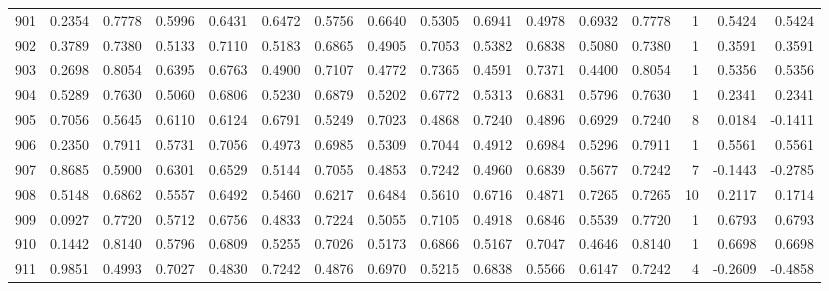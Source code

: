 \begin{tabular}{lrrrrrrrrrrrrrrr}
901 &      0.2354 &  0.7778 &  0.5996 &  0.6431 &  0.6472 &  0.5756 &  0.6640 &  0.5305 &  0.6941 &  0.4978 &   0.6932 &     0.7778 &      1 &                    0.5424 &                     0.5424 \\
902 &      0.3789 &  0.7380 &  0.5133 &  0.7110 &  0.5183 &  0.6865 &  0.4905 &  0.7053 &  0.5382 &  0.6838 &   0.5080 &     0.7380 &      1 &                    0.3591 &                     0.3591 \\
903 &      0.2698 &  0.8054 &  0.6395 &  0.6763 &  0.4900 &  0.7107 &  0.4772 &  0.7365 &  0.4591 &  0.7371 &   0.4400 &     0.8054 &      1 &                    0.5356 &                     0.5356 \\
904 &      0.5289 &  0.7630 &  0.5060 &  0.6806 &  0.5230 &  0.6879 &  0.5202 &  0.6772 &  0.5313 &  0.6831 &   0.5796 &     0.7630 &      1 &                    0.2341 &                     0.2341 \\
905 &      0.7056 &  0.5645 &  0.6110 &  0.6124 &  0.6791 &  0.5249 &  0.7023 &  0.4868 &  0.7240 &  0.4896 &   0.6929 &     0.7240 &      8 &                    0.0184 &                    -0.1411 \\
906 &      0.2350 &  0.7911 &  0.5731 &  0.7056 &  0.4973 &  0.6985 &  0.5309 &  0.7044 &  0.4912 &  0.6984 &   0.5296 &     0.7911 &      1 &                    0.5561 &                     0.5561 \\
907 &      0.8685 &  0.5900 &  0.6301 &  0.6529 &  0.5144 &  0.7055 &  0.4853 &  0.7242 &  0.4960 &  0.6839 &   0.5677 &     0.7242 &      7 &                   -0.1443 &                    -0.2785 \\
908 &      0.5148 &  0.6862 &  0.5557 &  0.6492 &  0.5460 &  0.6217 &  0.6484 &  0.5610 &  0.6716 &  0.4871 &   0.7265 &     0.7265 &     10 &                    0.2117 &                     0.1714 \\
909 &      0.0927 &  0.7720 &  0.5712 &  0.6756 &  0.4833 &  0.7224 &  0.5055 &  0.7105 &  0.4918 &  0.6846 &   0.5539 &     0.7720 &      1 &                    0.6793 &                     0.6793 \\
910 &      0.1442 &  0.8140 &  0.5796 &  0.6809 &  0.5255 &  0.7026 &  0.5173 &  0.6866 &  0.5167 &  0.7047 &   0.4646 &     0.8140 &      1 &                    0.6698 &                     0.6698 \\
911 &      0.9851 &  0.4993 &  0.7027 &  0.4830 &  0.7242 &  0.4876 &  0.6970 &  0.5215 &  0.6838 &  0.5566 &   0.6147 &     0.7242 &      4 &                   -0.2609 &                    -0.4858 \\

\end{tabular}
